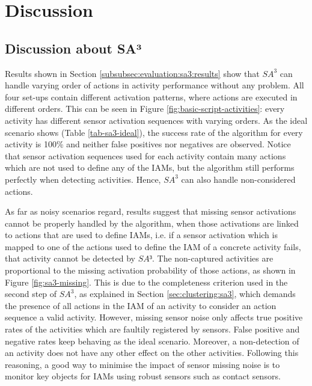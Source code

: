 \section{Discussion}
\label{sec:evaluation:discussion}

\subsection{Discussion about SA³}

Results shown in Section \ref{subsubsec:evaluation:sa3:results} show that $SA^3$ can handle varying order of actions in activity performance without any problem. All four set-ups contain different activation patterns, where actions are executed in different orders. This can be seen in Figure \ref{fig:basic-script-activities}: every activity has different sensor activation sequences with varying orders. As the ideal scenario shows (Table \ref{tab-sa3-ideal}), the success rate of the algorithm for every activity is 100\% and neither false positives nor negatives are observed. Notice that sensor activation sequences used for each activity contain many actions which are not used to define any of the IAMs, but the algorithm still performs perfectly when detecting activities. Hence, $SA^3$ can also handle non-considered actions.

As far as noisy scenarios regard, results suggest that missing sensor activations cannot be properly handled by the algorithm, when those activations are linked to actions that are used to define IAMs, i.e. if a sensor activation which is mapped to one of the actions used to define the IAM of a concrete activity fails, that activity cannot be detected by $SA³$. The non-captured activities are proportional to the missing activation probability of those actions, as shown in Figure \ref{fig:sa3-missing}. This is due to the completeness criterion used in the second step of $SA^3$, as explained in Section \ref{sec:clustering:sa3}, which demands the presence of all actions in the IAM of an activity to consider an action sequence a valid activity. However, missing sensor noise only affects true positive rates of the activities which are faultily registered by sensors. False positive and negative rates keep behaving as the ideal scenario. Moreover, a non-detection of an activity does not have any other effect on the other activities. Following this reasoning, a good way to minimise the impact of sensor missing noise is to monitor key objects for IAMs using robust sensors such as contact sensors.  

